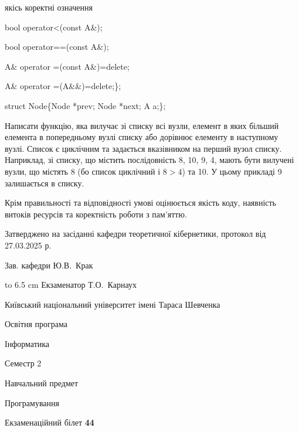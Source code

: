 \documentclass[12pt, ukrainian]{article}
\begin{document}
{\quad  якісь коректні означення 

\quad  bool operator<(const A\&); 

\quad  bool operator==(const A\&); 

\quad A\& operator =(const A\&)=delete; 

\quad  A\& operator =(A\&\&)=delete;\};

struct Node\{Node *prev; Node *next; A a;\};

Написати функцію, яка вилучає зі списку всі вузли, елемент в яких більший елемента в попередньому вузлі списку або дорівнює елементу в наступному вузлі. Список є циклічним та задається вказівником на перший вузол списку. Наприклад, зі списку, що містить послідовність 8, 10, 9, 4, мають бути вилучені вузли, що містять 8 (бо список циклічний і $8>4$) та 10. У цьому прикладі 9 залишається в списку.

Крім правильності та відповідності умові оцінюється якість коду, наявність витоків ресурсів та коректність роботи з пам'яттю. 

}
{\smallskip\smallskip \begin {scriptsize} Затверджено на засіданні кафедри теоретичної кібернетики, протокол   від   27.03.2025 р.\par\smallskip\smallskip\smallskip\smallskip
{\parbox {6.5 cm} {Зав. кафедри \dotfill Ю.В.~Крак}}\hspace {0.7cm} {\hbox to 6.5 cm { Екзаменатор \dotfill Т.О.~Карнаух}} \end{scriptsize}}
\newpage
{{\begin {scriptsize}\par
{ \center  Київський національний університет імені Тараса Шевченка \par}
{\parbox {5 cm}{Освітня програма \hfill}{\parbox {7 cm}{Інформатика\hfill}}\parbox {6 cm}{\hfill Семестр 2}}\par
{\parbox {5 cm} {Навчальний предмет \hfill}\parbox {7 cm}{Програмування \hfill}\parbox {6cm}{\hfill}\par}\vspace{-15pt} \end{scriptsize}}{\center Екзаменаційний білет \No \textbf { 44 }\par}}
\end{document}
